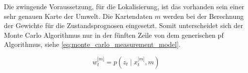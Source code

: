 Die zwingende Voraussetzung, für die Lokalisierung, ist das vorhanden sein einer sehr genauen Karte der Umwelt. Die Kartendaten $m$ werden bei der Berechnung der Gewichte für die Zustandsprognosen eingesetzt. Somit unterscheidet sich der Monte Carlo Algorithmus nur in der fünften Zeile von dem generischen \gls{pf} Algorithmus, siehe \autoref{eq:monte_carlo_measurement_model}. 

\begin{equation}
w^{\lbrack m \rbrack}_t = p(z_t \mid x^{\lbrack m \rbrack}_t, m) \label{eq:monte_carlo_measurement_model}
\end{equation}

%


